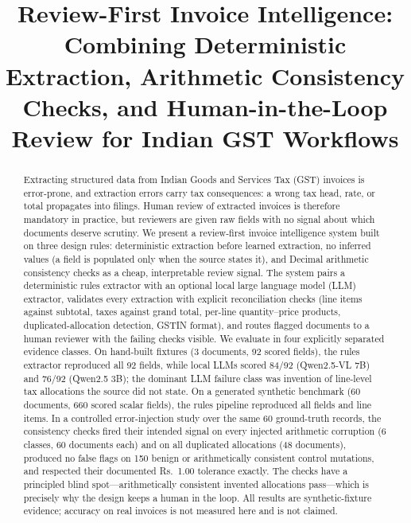 \documentclass[conference]{IEEEtran}
\begin{document}
\title{Review-First Invoice Intelligence: Combining Deterministic Extraction, Arithmetic Consistency Checks, and Human-in-the-Loop Review for Indian GST Workflows}

\author{
}

\maketitle

\begin{abstract}
Extracting structured data from Indian Goods and Services Tax (GST) invoices is error-prone, and extraction errors carry tax consequences: a wrong tax head, rate, or total propagates into filings. Human review of extracted invoices is therefore mandatory in practice, but reviewers are given raw fields with no signal about which documents deserve scrutiny. We present a review-first invoice intelligence system built on three design rules: deterministic extraction before learned extraction, no inferred values (a field is populated only when the source states it), and Decimal arithmetic consistency checks as a cheap, interpretable review signal. The system pairs a deterministic rules extractor with an optional local large language model (LLM) extractor, validates every extraction with explicit reconciliation checks (line items against subtotal, taxes against grand total, per-line quantity--price products, duplicated-allocation detection, GSTIN format), and routes flagged documents to a human reviewer with the failing checks visible. We evaluate in four explicitly separated evidence classes. On hand-built fixtures (3 documents, 92 scored fields), the rules extractor reproduced all 92 fields, while local LLMs scored 84/92 (Qwen2.5-VL 7B) and 76/92 (Qwen2.5 3B); the dominant LLM failure class was invention of line-level tax allocations the source did not state. On a generated synthetic benchmark (60 documents, 660 scored scalar fields), the rules pipeline reproduced all fields and line items. In a controlled error-injection study over the same 60 ground-truth records, the consistency checks fired their intended signal on every injected arithmetic corruption (6 classes, 60 documents each) and on all duplicated allocations (48 documents), produced no false flags on 150 benign or arithmetically consistent control mutations, and respected their documented Rs.~1.00 tolerance exactly. The checks have a principled blind spot---arithmetically consistent invented allocations pass---which is precisely why the design keeps a human in the loop. All results are synthetic-fixture evidence; accuracy on real invoices is not measured here and is not claimed.
\end{abstract}
\end{document}
